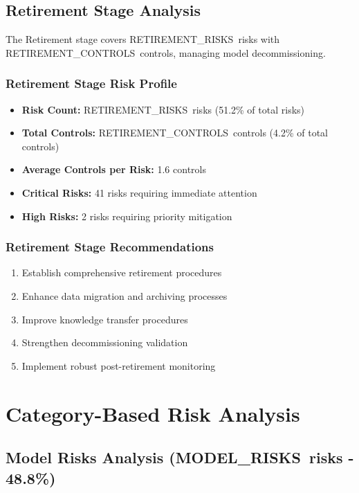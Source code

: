 \documentclass[11pt,a4paper]{article}
\newcommand{\modelrisks}{{{MODEL_RISKS}}}
\newcommand{\retirementrisks}{{{RETIREMENT_RISKS}}}
\newcommand{\retirementcontrols}{{{RETIREMENT_CONTROLS}}}
\begin{document}
\subsection{Retirement Stage Analysis}

The Retirement stage covers \retirementrisks\ risks with \retirementcontrols\ controls, managing model decommissioning.

\subsubsection{Retirement Stage Risk Profile}
\begin{itemize}
\item \textbf{Risk Count:} \retirementrisks\ risks (51.2\% of total risks)
\item \textbf{Total Controls:} \retirementcontrols\ controls (4.2\% of total controls)
\item \textbf{Average Controls per Risk:} 1.6 controls
\item \textbf{Critical Risks:} 41 risks requiring immediate attention
\item \textbf{High Risks:} 2 risks requiring priority mitigation
\end{itemize}

\subsubsection{Retirement Stage Recommendations}
\begin{enumerate}
\item Establish comprehensive retirement procedures
\item Enhance data migration and archiving processes
\item Improve knowledge transfer procedures
\item Strengthen decommissioning validation
\item Implement robust post-retirement monitoring
\end{enumerate}

\newpage

\section{Category-Based Risk Analysis}

\subsection{Model Risks Analysis (\modelrisks\ risks - 48.8\%)}
\end{document}
